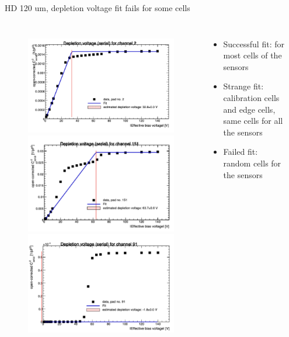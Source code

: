 \documentclass{beamer}
\begin{document}

\begin{frame}{HD 120 um, depletion voltage fit fails for some cells}
  \begin{columns}
    \begin{figure}
      \includegraphics[width=.55\textwidth]{plots/CV_Fit_just_figures1.png}
      \includegraphics[width=.55\textwidth]{plots/CV_Fit_just_figures2.png}
      \includegraphics[width=.55\textwidth]{plots/CV_Fit_just_figures3.png}
    \end{figure}

    \begin{itemize}
      \item Successful fit: for most cells of the sensors
      \item Strange fit: calibration cells and edge cells, same cells for all the sensors
      \item Failed fit: random cells for the sensors
    \end{itemize}
    \href{https://indico.cern.ch/event/1119831/contributions/4702464/attachments/2378225/4063679/Si\%20sensor\%20meeting.pdf}{}


\end{columns}

\end{frame}
\end{document}
